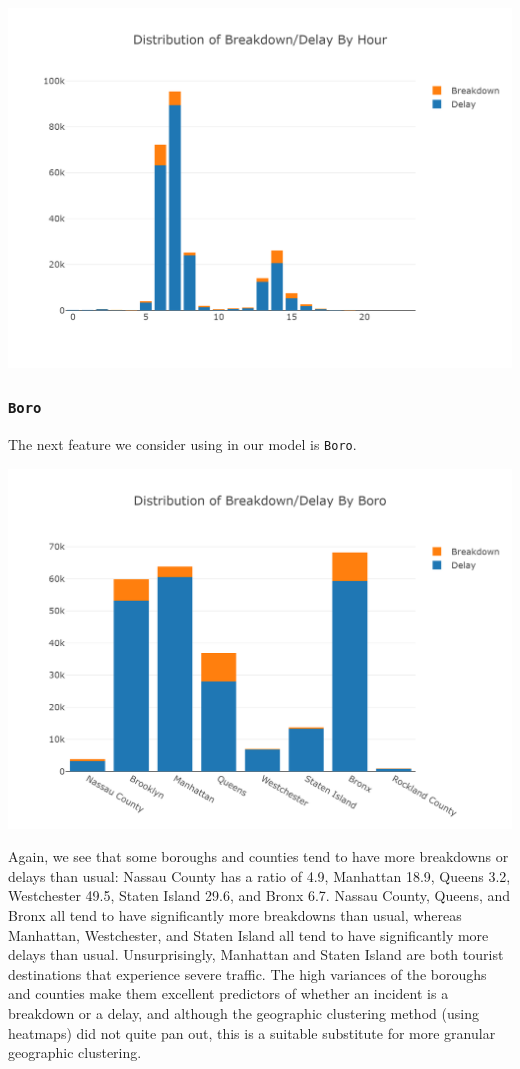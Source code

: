 \documentclass[11pt]{article}
\begin{document}
\begin{center}
\includegraphics[width=5.25in]{images/hour_stacked.png}
\end{center}

\subsubsection{\texttt{Boro}}
The next feature we consider using in our model is \texttt{Boro}.
\begin{center}
\includegraphics[width=5.25in]{images/boro_stacked.png}
\end{center}
Again, we see that some boroughs and counties tend to have more breakdowns or delays than usual: Nassau County has a ratio of 4.9, Manhattan 18.9, Queens 3.2, Westchester 49.5, Staten Island 29.6, and Bronx 6.7. Nassau County, Queens, and Bronx all tend to have significantly more breakdowns than usual, whereas Manhattan, Westchester, and Staten Island all tend to have significantly more delays than usual. Unsurprisingly, Manhattan and Staten Island are both tourist destinations that experience severe traffic. The high variances of the boroughs and counties make them excellent predictors of whether an incident is a breakdown or a delay, and although the geographic clustering method (using heatmaps) did not quite pan out, this is a suitable substitute for more granular geographic clustering.
\end{document}
